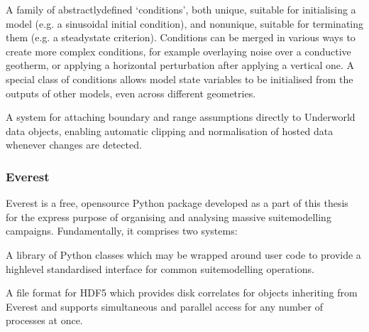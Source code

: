 \documentclass[letterpaper,10pt,english]{jupyterBook}
\begin{document}
\sphinxAtStartPar
A family of abstractly\sphinxhyphen{}defined ‘conditions’, both unique, suitable for initialising a model (e.g. a sinusoidal initial condition), and non\sphinxhyphen{}unique, suitable for terminating them (e.g. a steady\sphinxhyphen{}state criterion). Conditions can be merged in various ways to create more complex conditions, for example overlaying noise over a conductive geotherm, or applying a horizontal perturbation after applying a vertical one. A special class of conditions allows model state variables to be initialised from the outputs of other models, even across different geometries.

\sphinxAtStartPar
A system for attaching boundary and range assumptions directly to Underworld data objects, enabling automatic clipping and normalisation of hosted data whenever changes are detected.


\subsubsection{Everest}
\label{\detokenize{content/chapter_02_methods/section3:everest}}
\sphinxAtStartPar
Everest is a free, open\sphinxhyphen{}source Python package developed as a part of this thesis for the express purpose of organising and analysing massive suite\sphinxhyphen{}modelling campaigns. Fundamentally, it comprises two systems:

\sphinxAtStartPar
A library of Python classes which may be wrapped around user code to provide a high\sphinxhyphen{}level standardised interface for common suite\sphinxhyphen{}modelling operations.

\sphinxAtStartPar
A file format for HDF5 which provides disk correlates for objects inheriting from Everest and supports simultaneous and parallel access for any number of processes at once.
\end{document}
